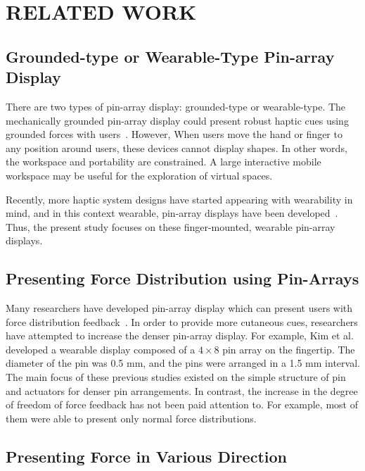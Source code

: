 \section{RELATED WORK}
\subsection{Grounded-type or Wearable-Type Pin-array Display}

There are two types of pin-array display: grounded-type or wearable-type.
The mechanically grounded pin-array display could present robust haptic cues using grounded forces with users~\cite{Shimizu1993, Howe, Leithinger:2010:RSA:1709886.1709928}.
However, When users move the hand or finger to any position around users, these devices cannot display shapes.
In other words, the workspace and portability are constrained.
A large interactive mobile workspace may be useful for the exploration of virtual spaces.

Recently, more haptic system designs have started appearing with wearability in mind, and in this context wearable, pin-array displays have been developed~\cite{Koo2008, Kim2009}.
Thus, the present study focuses on these finger-mounted, wearable pin-array displays.

\subsection{Presenting Force Distribution using Pin-Arrays}

Many researchers have developed pin-array display which can present users with force distribution feedback~\cite{Moy2000,Velazquez2005,Sarakoglou2005,Kim2009,Jang:2016:HED:2858036.2858264,Benko:2016:NTH:2984511.2984526}.
In order to provide more cutaneous cues, researchers have attempted to increase the denser pin-array display.
For example, Kim et al.~\cite{Kim2009} developed a wearable display composed of a $4\times8$ pin array on the fingertip.
The diameter of the pin was 0.5 mm, and the pins were arranged in a 1.5 mm interval.
The main focus of these previous studies existed on the simple structure of pin and actuators for denser pin arrangements.
In contrast, the increase in the degree of freedom of force feedback has not been paid attention to.
For example, most of them were able to present only normal force distributions.


\subsection{Presenting Force in Various Direction}


